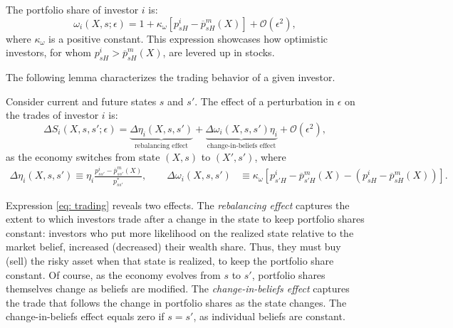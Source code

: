 The portfolio share of investor $i$ is:
\begin{equation}
    \omega_{i}(X,s; \epsilon) = 1 +\kappa_\omega \left[p_{sH}^i - \overline{p}^m_{sH}(X)\right] + \mathcal{O}(\epsilon^2),\nonumber
\end{equation}
where $\kappa_\omega$ is a positive constant. 
This expression showcases how optimistic investors, for whom $p_{sH}^i > \overline{p}^m_{sH}(X)$, are levered up in stocks. 

The following lemma characterizes the trading behavior of a given investor.
\begin{lemma}\label{lem: trading}
    Consider current and future states $s$ and $s'$. The effect of a perturbation in $\epsilon$ on the trades of investor $i$ is:
    \begin{equation}
        \Delta S_i(X,s,s';\epsilon) =
        \underbrace{\Delta \eta_i(X,s,s')}_{\text{rebalancing effect}}+\underbrace{\Delta \omega_i(X,s,s') \eta_i}_{\text{change-in-beliefs effect}} + \mathcal{O}(\epsilon^2),
    \end{equation}
    as the economy switches from state $(X,s)$ to $(X',s')$, where\small
    \begin{align}
        \Delta \eta_i(X,s,s') \equiv \eta_i \frac{p_{ss'}^i - \overline{p}_{ss'}^m(X)}{p_{ss'}^*} , \qquad
        \Delta \omega_i(X,s,s') &\equiv \kappa_\omega\left[p_{s'H}^i - \overline{p}_{s'H}^m(X) - (p_{sH}^i - \overline{p}^m_{sH}(X)) \right] .\nonumber
    \end{align}\normalsize
\end{lemma}


Expression \eqref{eq: trading} reveals two effects. 
The \textit{rebalancing effect} captures the extent to which investors trade after a change in the state to keep portfolio shares constant: investors who put more likelihood on the realized state relative to the market belief, increased (decreased) their wealth share. Thus, they must buy (sell) the risky asset when that state is realized, to keep the portfolio share constant. Of course, as the economy evolves from $s$ to $s'$, portfolio shares themselves change as beliefs are modified. The \textit{change-in-beliefs effect} captures the trade that follows the change in portfolio shares as the state changes. The change-in-beliefs effect equals zero if $s = s'$, as individual beliefs are constant.  

